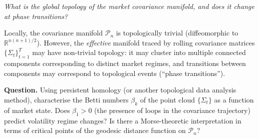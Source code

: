 \begin{openquestion}
\label{oq:topology}
\emph{What is the global topology of the market covariance manifold, and
does it change at phase transitions?}

Locally, the covariance manifold $\mathcal{P}_n$ is topologically trivial
(diffeomorphic to $\mathbb{R}^{n(n+1)/2}$).  However, the \emph{effective}
manifold traced by rolling covariance matrices $\{\Sigma_t\}_{t=1}^{T}$
may have non-trivial topology: it may cluster into multiple connected
components corresponding to distinct market regimes, and transitions between
components may correspond to topological events (``phase transitions'').

\textbf{Question.}  Using persistent homology (or another topological data
analysis method), characterise the Betti numbers $\beta_k$ of the point
cloud $\{\Sigma_t\}$ as a function of market state.  Does $\beta_1 > 0$
(the presence of loops in the covariance trajectory) predict volatility
regime changes?  Is there a Morse-theoretic interpretation in terms of
critical points of the geodesic distance function on $\mathcal{P}_n$?
\end{openquestion}
